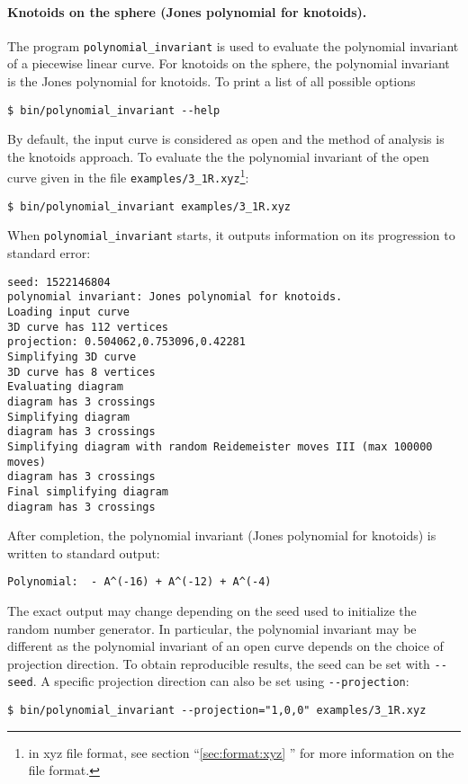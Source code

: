 \paragraph{Knotoids on the sphere (Jones polynomial for knotoids).}
The program \lstinline{polynomial_invariant} is used to evaluate the polynomial invariant of a piecewise linear curve. For knotoids on the sphere, the polynomial invariant is the Jones polynomial for knotoids. To print a list of all possible options
\begin{lstlisting}
$ bin/polynomial_invariant --help
\end{lstlisting}
By default, the input curve is considered as open and the method of analysis is the knotoids approach. To evaluate the the polynomial invariant of the open curve given in the file \lstinline{examples/3_1R.xyz}\footnote{in xyz file format, see section ``\ref{sec:format:xyz} '' for more information on the file format.}:
\begin{lstlisting}
$ bin/polynomial_invariant examples/3_1R.xyz
\end{lstlisting}
When \lstinline{polynomial_invariant} starts, it outputs information on its progression to standard error:
\begin{lstlisting}
seed: 1522146804
polynomial invariant: Jones polynomial for knotoids.
Loading input curve
3D curve has 112 vertices
projection: 0.504062,0.753096,0.42281
Simplifying 3D curve
3D curve has 8 vertices
Evaluating diagram
diagram has 3 crossings
Simplifying diagram
diagram has 3 crossings
Simplifying diagram with random Reidemeister moves III (max 100000 moves)
diagram has 3 crossings
Final simplifying diagram
diagram has 3 crossings
\end{lstlisting}
After completion, the polynomial invariant (Jones polynomial for knotoids) is written to standard output:
\begin{lstlisting}
Polynomial:  - A^(-16) + A^(-12) + A^(-4)
\end{lstlisting}
The exact output may change depending on the seed used to initialize the random number generator. In particular, the polynomial invariant may be different as the polynomial invariant of an open curve depends on the choice of projection direction. To obtain reproducible results, the seed can be set with \lstinline{--seed}. A specific projection direction can also be set using \lstinline{--projection}:
\begin{lstlisting}
$ bin/polynomial_invariant --projection="1,0,0" examples/3_1R.xyz
\end{lstlisting}

